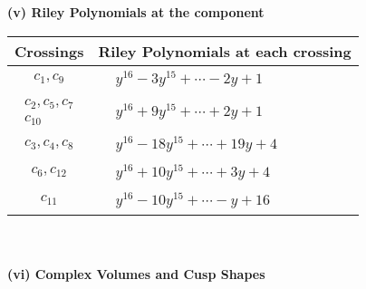 \documentclass[1p]{elsarticle_modified}
\theoremstyle{definition}
\begin{document}
\newpage\renewcommand{\arraystretch}{1}
\flushleft \textbf{(v) Riley Polynomials at the component}\newline \\
\begin{tabular}{m{50pt}|m{274pt}}
Crossings & \hspace{64pt}Riley Polynomials at each crossing \\
\hline $$\begin{aligned}c_{1},c_{9}\end{aligned}$$&$\begin{aligned}
&y^{16}-3 y^{15}+\cdots-2 y+1
\end{aligned}$\\
\hline $$\begin{aligned}c_{2},c_{5},c_{7}\\c_{10}\end{aligned}$$&$\begin{aligned}
&y^{16}+9 y^{15}+\cdots+2 y+1
\end{aligned}$\\
\hline $$\begin{aligned}c_{3},c_{4},c_{8}\end{aligned}$$&$\begin{aligned}
&y^{16}-18 y^{15}+\cdots+19 y+4
\end{aligned}$\\
\hline $$\begin{aligned}c_{6},c_{12}\end{aligned}$$&$\begin{aligned}
&y^{16}+10 y^{15}+\cdots+3 y+4
\end{aligned}$\\
\hline $$\begin{aligned}c_{11}\end{aligned}$$&$\begin{aligned}
&y^{16}-10 y^{15}+\cdots- y+16
\end{aligned}$\\
\hline
\end{tabular}\\~\\
\newpage\flushleft \textbf{(vi) Complex Volumes and Cusp Shapes}
\end{document}
